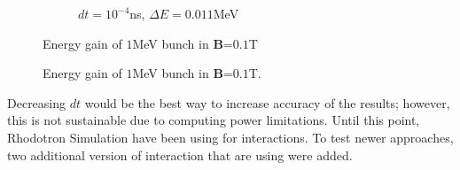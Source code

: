 \documentclass[a4paper,oneside,12pt]{report}
\numberwithin{equation}{chapter}
\begin{document}
{\begin{figure}
\begin{subfigure}{0.8\textwidth}
        \caption*{$dt=10^{-4}$ns, $\Delta E=0.011$MeV}
    \end{subfigure}
    \caption{Energy gain of $1$MeV bunch in \textbf{B}=$0.1$T}
    \label{fig:mag_lf_render}
\end{figure} \fi
\begin{figure}
    \centering
    \vspace{1pt}
    \vspace{5pt}
    \caption{Energy gain of $1$MeV bunch in \textbf{B}=$0.1$T.}
    \label{fig:mag_lf_render}
\end{figure}
Decreasing $dt$ would be the best way to increase accuracy of the results; however, this is not sustainable due to computing power limitations. 
Until this point, Rhodotron Simulation have been using  for \eEM interactions. 
To test newer approaches, two additional version of  \eEM interaction that are using  were added.
}
\end{document}
